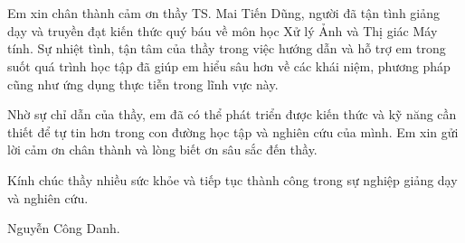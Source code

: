 \section*{}
Em xin chân thành cảm ơn thầy TS. Mai Tiến Dũng,
người đã tận tình giảng dạy và truyền đạt kiến thức quý báu về môn học Xử lý Ảnh và Thị giác Máy tính.
Sự nhiệt tình, tận tâm của thầy trong việc hướng dẫn
và hỗ trợ em trong suốt quá trình học tập đã giúp em hiểu sâu hơn về các khái niệm,
phương pháp cũng như ứng dụng thực tiễn trong lĩnh vực này.

Nhờ sự chỉ dẫn của thầy,
em đã có thể phát triển được kiến thức và kỹ năng cần thiết
để tự tin hơn trong con đường học tập và nghiên cứu của mình.
Em xin gửi lời cảm ơn chân thành và lòng biết ơn sâu sắc đến thầy.

Kính chúc thầy nhiều sức khỏe và tiếp tục thành công trong sự nghiệp giảng dạy và nghiên cứu.


\begin{flushright}
    Nguyễn Công Danh.
\end{flushright}

